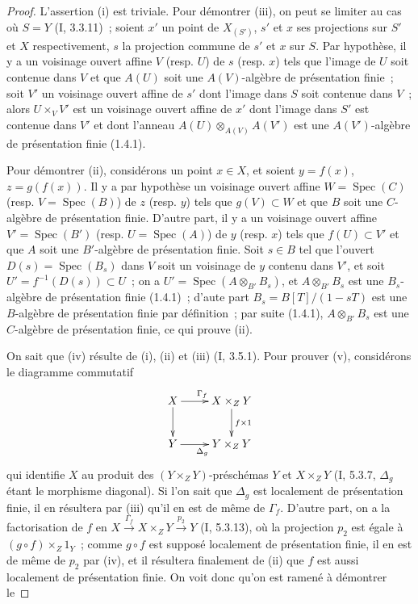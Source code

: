 \begin{proof}
L'assertion (i) est triviale. Pour démontrer (iii), on peut se limiter au cas
où $S=Y$ (I, 3.3.11)~; soient $x'$ un point de $X_{(S')}$, $s'$ et $x$ ses
projections sur $S'$ et $X$ respectivement, $s$ la projection commune de $s'$
et $x$ sur $S$. Par hypothèse, il y a un voisinage ouvert affine $V$ (resp.
$U$) de $s$ (resp. $x$) tels que l'image de $U$ soit contenue dans $V$ et que
$A(U)$ soit une $A(V)$-algèbre de présentation finie~; soit $V'$ un voisinage
ouvert affine de $s'$ dont l'image dans $S$ soit contenue dans $V$~; alors
$U\times_VV'$ est un voisinage ouvert affine de $x'$ dont l'image dans $S'$
est contenue dans $V'$ et dont l'anneau $A(U)\otimes_{A(V)}A(V')$ est une
$A(V')$-algèbre de présentation finie (1.4.1).

Pour démontrer (ii), considérons un point $x\in X$, et soient $y=f(x)$,
$z=g(f(x))$. Il y a par hypothèse un voisinage ouvert affine $W=\operatorname{Spec}(C)$
(resp. $V=\operatorname{Spec}(B)$) de $z$ (resp. $y$) tels que $g(V)\subset W$ et que $B$
soit une $C$-algèbre de présentation finie. D'autre part, il y a un voisinage
ouvert affine $V'=\operatorname{Spec}(B')$ (resp. $U=\operatorname{Spec}(A)$) de $y$ (resp. $x$) tels que
$f(U)\subset V'$ et que $A$ soit une $B'$-algèbre de présentation finie. Soit
$s\in B$ tel que l'ouvert $D(s)=\operatorname{Spec}(B_s)$ dans $V$ soit un voisinage de $y$
contenu dans $V'$, et soit $U'=f^{-1}(D(s))\subset U$~; on a
$U'=\operatorname{Spec}(A\otimes_{B'}B_s)$, et $A\otimes_{B'}B_s$ est une $B_s$-algèbre de
présentation finie (1.4.1)~; d'aute part $B_s=B[T]/(1-sT)$ est une
$B$-algèbre de présentation finie par définition~; par suite (1.4.1),
$A\otimes_{B'}B_s$ est une $C$-algèbre de présentation finie, ce qui prouve
(ii).

On sait que (iv) résulte de (i), (ii) et (iii) (I, 3.5.1). Pour prouver (v),
considérons le diagramme commutatif
\[
\xymatrix{
X \ar[r]^{\Gamma_f} \ar[d] & X\times_ZY \ar[d]^{f\times 1} \\
Y \ar[r]_{\Delta_g} & Y\times_ZY
}
\]
qui identifie $X$ au produit des $(Y\times_ZY)$-préschémas $Y$ et
$X\times_ZY$ (I, 5.3.7, $\Delta_g$ étant le morphisme diagonal). Si l'on sait
que $\Delta_g$ est localement de présentation finie, il en résultera par
(iii) qu'il en est de même de $\Gamma_f$. D'autre part, on a la factorisation
de $f$ en
$X\xrightarrow{\Gamma_f}X\times_ZY\xrightarrow{p_2}Y$ (I, 5.3.13), où la
projection $p_2$ est égale à $(g\circ f)\times_Z1_Y$~; comme $g\circ f$ est
supposé localement de présentation finie, il en est de même de $p_2$ par
(iv), et il résultera finalement de (ii) que $f$ est aussi localement de
présentation finie. On voit donc qu'on est ramené à démontrer le
\end{proof}

